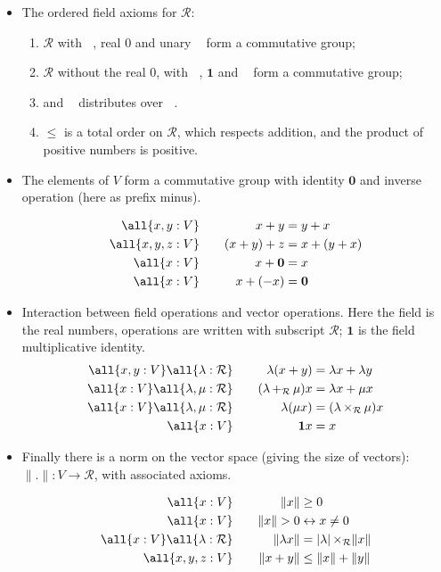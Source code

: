 \documentclass{my-blue-book}
\newcommand{\real}{\mathcal{R}}
\renewcommand{\real}{\mathcal{R}}
\DeclareMathOperator{\plusR}{+_{\real}}
\DeclareMathOperator{\timesR}{\times_{\real}}
\DeclareMathOperator{\minusR}{-_{\real}}
\DeclareMathOperator{\invR}{^{-1_{\real}}}
\newcommand{\minus}[1]{-{#1}}
\newcommand{\origin}{\mathbf{0}}
\newcommand{\one}{\mathbf{1}}
\newcommand{\mapsTo}{\rightarrow}
\newcommand{\norm}[1]{\lVert#1\rVert}
\newcommand{\modulus}[1]{\lvert#1\rvert}
\begin{document}
\begin{itemize}
\item The ordered field axioms for $\real$:
  \begin{enumerate}
  \item $\real$ with $\plusR$, real 0  and unary $\minusR$
       form a commutative group;
  \item $\real$ without the real 0,
    with $\timesR$, $\one$ and $\invR$ form a commutative group;
  \item and $\timesR$ distributes over $\plusR$.
  \item $\leq$ is a total order on $\real$, which respects addition,
        and the product of positive numbers is positive.
  \end{enumerate}

\item The elements of $V$ form a commutative group with identity $\origin$
and inverse operation (here as prefix minus).

\begin{alignat}{2}
  \all{x,y:V} \quad&&x + y         &= y + x\\
  \all{x,y,z:V} \quad &&(x + y) + z &= x + (y + x)\\
  \all{x:V}  \quad&&x + \origin    &= x\\
  \all{x:V}  \quad&&x + (\minus{x}) &= \origin
\end{alignat}


\item Interaction between field operations and vector operations.  Here
  the field is the real numbers, operations are written
with subscript $\real$;  $\one$ is the field multiplicative identity.
\begin{alignat}{2}
  \all{x,y:V} \all{\lambda:\real} \quad&& 
            \lambda(x + y) &= \lambda x + \lambda y\\
  \all{x:V} \all{\lambda,\mu : \real} \quad &&
            (\lambda \plusR \mu)x &= \lambda x  + \mu x\\
  \all{x:V} \all{\lambda,\mu : \real} \quad && 
            \lambda(\mu x) &= (\lambda \timesR \mu) x \\
  \all{x:V}  \quad&& \one x &= x
\end{alignat}
\item 

Finally there is a norm on the vector space (giving the size of
vectors): $\norm{.} : V \mapsTo \real$, with associated axioms.

\begin{alignat}{2}
  \all{x:V} \quad && \norm{x} & \geq 0 \\
  \all{x:V} \quad && \norm{x} > 0 & \leftrightarrow x \neq 0 \\
  \all{x:V} \all{\lambda:\real} \quad && \norm{\lambda x} 
                   &= \modulus{\lambda} \timesR \norm{x} \\
  \all{x,y,z:V} \quad && \norm{x + y} & \leq \norm{x} + \norm{y}
\end{alignat}

\end{itemize}
\end{document}
